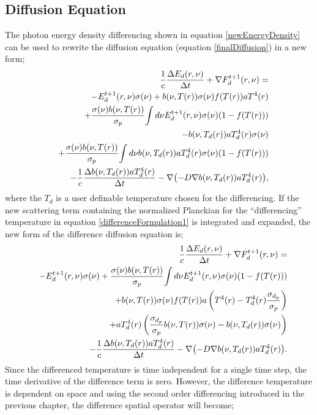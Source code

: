\subsection{Diffusion Equation}
\label{sec:DifferenceFormulation-Diffusion-Equation}

\noindent
	\indent The photon energy density differencing shown in equation \ref{newEnergyDensity} can be used to rewrite the diffusion equation (equation \ref{finalDiffusion}) in a new form;
	\begin{eqnarray}
	\label{differenceFormulation1}
	& &{1\over{c}}{\Delta{E_d(r,\nu)}\over{\Delta{t}}} + \nabla{F^{t+1}_{d}(r,\nu)}=\nonumber \\& & -E^{t+1}_{d}(r,\nu)\sigma(\nu)+{b(\nu,T(r))}\sigma(\nu)f(T(r)) aT^4(r)\nonumber \\& & +{\sigma(\nu)b(\nu,T(r))\over{\sigma_p}}{\int{d\nu}E^{t+1}_{d}(r,\nu)\sigma(\nu)(1-f(T(r)))}\nonumber \\& &
	-b(\nu,T_d(r))aT_d^4(r)\sigma(\nu)\nonumber \\& &
	+{\sigma(\nu)b(\nu,T(r))\over{\sigma_p}}{\int{d\nu}b(\nu,T_d(r))aT_d^4(r)\sigma(\nu)(1-f(T(r)))}\nonumber \\& &
	-{1\over{c}}{\Delta{b(\nu,T_d(r))aT_d^4(r)}\over{\Delta{t}}} - \nabla{\left(-D\nabla{b(\nu,T_d(r))}aT_d^4(r)\right)},
	\end{eqnarray}
	where the $T_d$ is a user definable temperature chosen for the differencing. If the new scattering term containing the normalized Planckian for the ``differencing'' temperature in equation \ref{differenceFormulation1} is integrated and expanded, the new form of the difference diffusion equation is;
	\begin{eqnarray}
	\label{differenceFormulation2}
	& &{1\over{c}}{\Delta{E_d(r,\nu)}\over{\Delta{t}}} + \nabla{F^{t+1}_{d}(r,\nu)}=\nonumber \\& & -E^{t+1}_{d}(r,\nu)\sigma(\nu)+{\sigma(\nu)b(\nu,T(r))\over{\sigma_p}}{\int{d\nu}E^{t+1}_{d}(r,\nu)\sigma(\nu)(1-f(T(r)))}\nonumber \\& &
	+b(\nu,T(r))\sigma(\nu){f(T(r))}a\left(T^4(r)-T_d^4(r){\sigma_{d_p}\over{\sigma_p}}\right)\nonumber \\& & +aT_d^4(r)\left({\sigma_{d_p}\over{\sigma_p}}b(\nu,T(r))\sigma(\nu)-b(\nu,T_d(r))\sigma(\nu)\right)\nonumber \\& &
	-{1\over{c}}{\Delta{b(\nu,T_d(r))aT_d^4(r)}\over{\Delta{t}}} - \nabla{\left(-D\nabla{b(\nu,T_d(r))}aT_d^4(r)\right)}.
	\end{eqnarray}
	Since the differenced temperature is time independent for a single time step, the time derivative of the difference term is zero. However, the difference temperature is dependent on space and using the second order differencing introduced in the previous chapter, the difference spatial operator will become;
